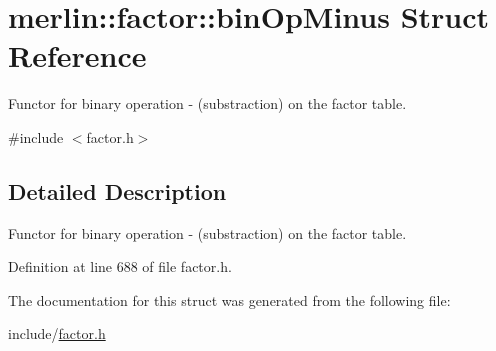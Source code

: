 \hypertarget{structmerlin_1_1factor_1_1binOpMinus}{}\section{merlin\+:\+:factor\+:\+:bin\+Op\+Minus Struct Reference}
\label{structmerlin_1_1factor_1_1binOpMinus}


Functor for binary operation -\/ (substraction) on the factor table.  




{\ttfamily \#include $<$factor.\+h$>$}



\subsection{Detailed Description}
Functor for binary operation -\/ (substraction) on the factor table. 

Definition at line 688 of file factor.\+h.



The documentation for this struct was generated from the following file\+:\begin{DoxyCompactItemize}
\item 
include/\hyperlink{factor_8h}{factor.\+h}\end{DoxyCompactItemize}
